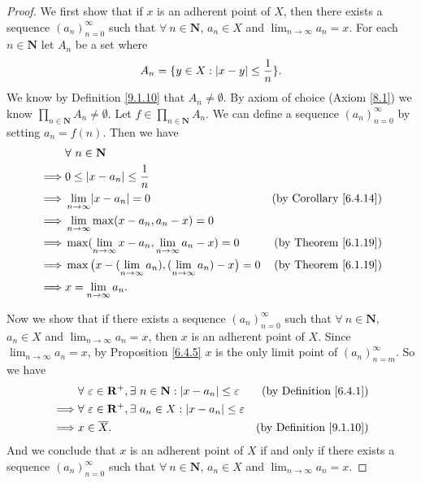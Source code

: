 \begin{proof}
    We first show that if \(x\) is an adherent point of \(X\), then there exists a sequence \((a_n)_{n = 0}^\infty\) such that \(\forall\ n \in \mathbf{N}\), \(a_n \in X\) and \(\lim_{n \to \infty} a_n = x\).
    For each \(n \in \mathbf{N}\) let \(A_n\) be a set where
    \[
        A_n = \{y \in X : \abs*{x - y} \leq \frac{1}{n}\}.
    \]
    We know by Definition \ref{9.1.10} that \(A_n \neq \emptyset\).
    By axiom of choice (Axiom \ref{8.1}) we know \(\prod_{n \in \mathbf{N}} A_n \neq \emptyset\).
    Let \(f \in \prod_{n \in \mathbf{N}} A_n\).
    We can define a sequence \((a_n)_{n = 0}^\infty\) by setting \(a_n = f(n)\).
    Then we have
    \begin{align*}
                 & \forall\ n \in \mathbf{N}                                                                                           \\
        \implies & 0 \leq \abs*{x - a_n} \leq \frac{1}{n}                                                                              \\
        \implies & \lim_{n \to \infty} \abs*{x - a_n} = 0                                         & \text{(by Corollary \ref{6.4.14})} \\
        \implies & \lim_{n \to \infty} \max(x - a_n, a_n - x) = 0                                                                      \\
        \implies & \max(\lim_{n \to \infty} x - a_n, \lim_{n \to \infty} a_n - x) = 0             & \text{(by Theorem \ref{6.1.19})}   \\
        \implies & \max\big(x - (\lim_{n \to \infty} a_n), (\lim_{n \to \infty} a_n) - x\big) = 0 & \text{(by Theorem \ref{6.1.19})}   \\
        \implies & x = \lim_{n \to \infty} a_n.
    \end{align*}

    Now we show that if there exists a sequence \((a_n)_{n = 0}^\infty\) such that \(\forall\ n \in \mathbf{N}\), \(a_n \in X\) and \(\lim_{n \to \infty} a_n = x\), then \(x\) is an adherent point of \(X\).
    Since \(\lim_{n \to \infty} a_n = x\), by Proposition \ref{6.4.5} \(x\) is the only limit point of \((a_n)_{n = m}^\infty\).
    So we have
    \begin{align*}
                 & \forall\ \varepsilon \in \mathbf{R}^+, \exists\ n \in \mathbf{N} : \abs*{x - a_n} \leq \varepsilon & \text{(by Definition \ref{6.4.1})}  \\
        \implies & \forall\ \varepsilon \in \mathbf{R}^+, \exists\ a_n \in X : \abs*{x - a_n} \leq \varepsilon                                              \\
        \implies & x \in \overline{X}.                                                                                & \text{(by Definition \ref{9.1.10})}
    \end{align*}
    And we conclude that \(x\) is an adherent point of \(X\) if and only if there exists a sequence \((a_n)_{n = 0}^\infty\) such that \(\forall\ n \in \mathbf{N}\), \(a_n \in X\) and \(\lim_{n \to \infty} a_n = x\).
\end{proof}

